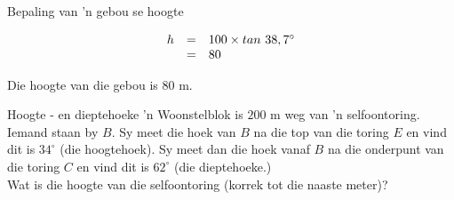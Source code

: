 \begin{wex}{Bepaling van 'n gebou se hoogte}
{\begin{equation*}
\begin{array}{ccl}

\hfill h& =& 100\times tan~38,7^{\circ }\hfill \\
& =& 80\hfill
  \end{array}
\end{equation*}

Die hoogte van die gebou is $80$ m.
}
\end{wex}


\begin{wex}{Hoogte - en dieptehoeke}
{'n Woonstelblok is $200$ m weg van 'n selfoontoring. Iemand staan by $B$. Sy meet die hoek van $B$ na die top van die toring $E$ en vind dit is $34^{\circ}$ (die hoogtehoek). Sy meet dan die hoek vanaf $B$ na die onderpunt van die toring $C$ en vind dit is $62^{\circ}$ (die dieptehoeke.)
\\Wat is die hoogte van die selfoontoring (korrek tot die naaste meter)?\\

}
\end{wex}
